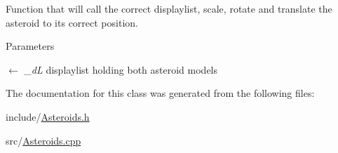 Function that will call the correct displaylist, scale, rotate and translate the asteroid to its correct position. 
\begin{DoxyParams}{Parameters}
\item[\mbox{$\leftarrow$} {\em \_\-dL}]displaylist holding both asteroid models \end{DoxyParams}


The documentation for this class was generated from the following files:\begin{DoxyCompactItemize}
\item 
include/\hyperlink{Asteroids_8h}{Asteroids.h}\item 
src/\hyperlink{Asteroids_8cpp}{Asteroids.cpp}\end{DoxyCompactItemize}
